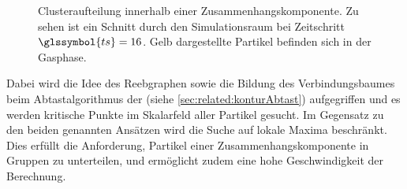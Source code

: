 \begin{figure}
	{\caption{Clusteraufteilung innerhalb einer Zusammenhangskomponente. Zu sehen ist ein Schnitt durch den Simulationsraum bei Zeitschritt $\glssymbol{ts} = 16$. Gelb dargestellte Partikel befinden sich in der Gasphase.}\label{fig:cluster-zusammenhang}}
\end{figure}

Dabei wird die Idee des Reebgraphen sowie die Bildung des Verbindungsbaumes beim Abtastalgorithmus der  (siehe \autoref{sec:related:konturAbtast}) aufgegriffen und es werden kritische Punkte im Skalarfeld aller Partikel gesucht. Im Gegensatz zu den beiden genannten Ansätzen wird die Suche auf lokale Maxima beschränkt. Dies erfüllt die Anforderung, Partikel einer Zusammenhangskomponente in Gruppen zu unterteilen, und ermöglicht zudem eine hohe Geschwindigkeit der Berechnung.

